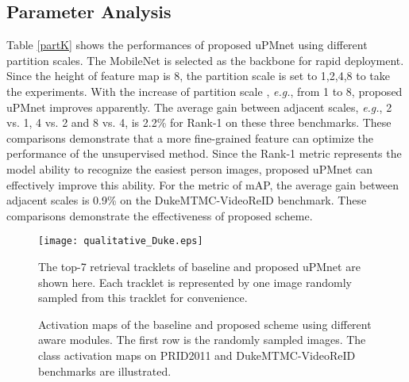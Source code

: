 \documentclass{cta-author}
\begin{document}
	\subsection{Parameter Analysis}
	Table \ref{partK} shows the performances of proposed uPMnet using different partition scales. The MobileNet is selected as the backbone for rapid deployment. 
	Since the height of feature map is 8, the partition scale  is set to 1,2,4,8 to take the experiments. 
	With the increase of partition scale , \textit{e.g.}, from 1 to 8, proposed uPMnet improves apparently. The average gain between adjacent scales, \textit{e.g.}, 2 vs. 1, 4 vs. 2 and 8 vs. 4, is 2.2\% for Rank-1 on these three benchmarks. These comparisons demonstrate that a more fine-grained feature can optimize the performance of the unsupervised method. Since the Rank-1 metric represents the model ability to recognize the easiest person images, proposed uPMnet can effectively improve this ability. For the metric of mAP, the average gain between adjacent scales is 0.9\% on the DukeMTMC-VideoReID benchmark. These comparisons demonstrate the effectiveness of proposed scheme.
	
	\begin{figure}[]
		\centering
		\begin{minipage}[b]{0.475\textwidth} 
			\texttt{[image: qualitative\_Duke.eps]}
		\end{minipage}
		\caption{The top-7 retrieval tracklets of baseline and proposed uPMnet are shown here. Each tracklet is represented by one image randomly sampled from this tracklet for convenience. } \label{qualitative results}
	\end{figure}
	
	\begin{figure}[]
		\centering
		\hspace{+5mm}
		\caption{Activation maps of the baseline and proposed scheme using different aware modules. The first row is the randomly sampled images. The class activation maps on PRID2011 and DukeMTMC-VideoReID benchmarks are illustrated.} \label{cam}
	\end{figure}
\end{document}

